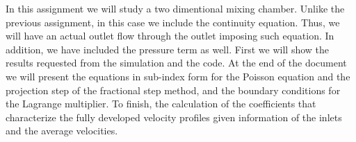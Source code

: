 In this assignment we will study a two dimentional mixing chamber. Unlike the previous assignment, in this case we include the continuity equation. Thus, we will have an actual outlet flow through the outlet imposing such equation. In addition, we have included the pressure term as well. First we will show the results requested from the simulation and the code. At the end of the document we will present the equations in sub-index form for the Poisson equation and the projection step of the fractional step method, and the boundary conditions for the Lagrange multiplier. To finish, the calculation of the coefficients that characterize the fully developed velocity profiles given information of the inlets and the average velocities.

